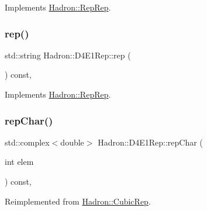 Implements \mbox{\hyperlink{structHadron_1_1RepRep_ab3213025f6de249f7095892109575fde}{Hadron\+::\+Rep\+Rep}}.

\mbox{\label{structHadron_1_1D4E1Rep_add1afe88264c5adac1932f9880a6d980}} 
\subsubsection{\texorpdfstring{rep()}{rep()}\hspace{0.1cm}{\footnotesize\ttfamily [3/3]}}
{\footnotesize\ttfamily std\+::string Hadron\+::\+D4\+E1\+Rep\+::rep (\begin{DoxyParamCaption}{ }\end{DoxyParamCaption}) const\hspace{0.3cm}{\ttfamily [inline]}, {\ttfamily [virtual]}}



Implements \mbox{\hyperlink{structHadron_1_1RepRep_ab3213025f6de249f7095892109575fde}{Hadron\+::\+Rep\+Rep}}.

\mbox{\label{structHadron_1_1D4E1Rep_a5c4eb87d8e59c8653c6d4da163c300ea}} 
\subsubsection{\texorpdfstring{repChar()}{repChar()}\hspace{0.1cm}{\footnotesize\ttfamily [1/2]}}
{\footnotesize\ttfamily std\+::complex$<$double$>$ Hadron\+::\+D4\+E1\+Rep\+::rep\+Char (\begin{DoxyParamCaption}\item[{int}]{elem }\end{DoxyParamCaption}) const\hspace{0.3cm}{\ttfamily [inline]}, {\ttfamily [virtual]}}



Reimplemented from \mbox{\hyperlink{structHadron_1_1CubicRep_af45227106e8e715e84b0af69cd3b36f8}{Hadron\+::\+Cubic\+Rep}}.


